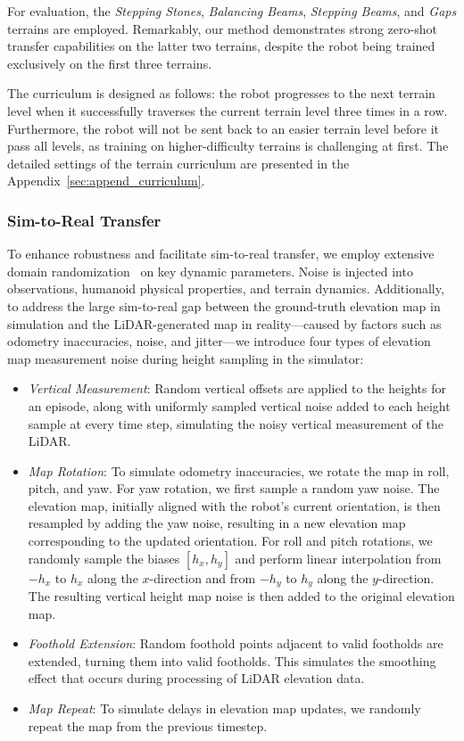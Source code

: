 

For evaluation, the \textit{Stepping Stones}, \textit{Balancing Beams}, \textit{Stepping Beams}, and \textit{Gaps} terrains are employed. Remarkably, our method demonstrates strong zero-shot transfer capabilities on the latter two terrains, despite the robot being trained exclusively on the first three terrains.

The curriculum is designed as follows: the robot progresses to the next terrain level when it successfully traverses the current terrain level three times in a row. Furthermore, the robot will not be sent back to an easier terrain level before it pass all levels, as training on higher-difficulty terrains is challenging at first. The detailed settings of the terrain curriculum are presented in the Appendix~\ref{sec:append_curriculum}.

\subsubsection{Sim-to-Real Transfer}
\label{sec:sim2real}

To enhance robustness and facilitate sim-to-real transfer, we employ extensive domain randomization~\cite{tobin2017domain, xie2021dynamics} on key dynamic parameters. Noise is injected into observations, humanoid physical properties, and terrain dynamics. Additionally, to address the large sim-to-real gap between the ground-truth elevation map in simulation and the LiDAR-generated map in reality—caused by factors such as odometry inaccuracies, noise, and jitter—we introduce four types of elevation map measurement noise during height sampling in the simulator:
\begin{itemize}
    \item \textit{Vertical Measurement}: Random vertical offsets are applied to the heights for an episode, along with uniformly sampled vertical noise added to each height sample at every time step, simulating the noisy vertical measurement of the LiDAR.
    \item \textit{Map Rotation}: To simulate odometry inaccuracies, we rotate the map in roll, pitch, and yaw. For yaw rotation, we first sample a random yaw noise. The elevation map, initially aligned with the robot's current orientation, is then resampled by adding the yaw noise, resulting in a new elevation map corresponding to the updated orientation. For roll and pitch rotations, we randomly sample the biases $\left[ h_x, h_y \right]$ and perform linear interpolation from $-h_x$ to $h_x$ along the $x$-direction and from $-h_y$ to $h_y$ along the $y$-direction. The resulting vertical height map noise is then added to the original elevation map.
    \item \textit{Foothold Extension}: Random foothold points adjacent to valid footholds are extended, turning them into valid footholds. This simulates the smoothing effect that occurs during processing of LiDAR elevation data.
    \item \textit{Map Repeat}: To simulate delays in elevation map updates, we randomly repeat the map from the previous timestep.
\end{itemize}

